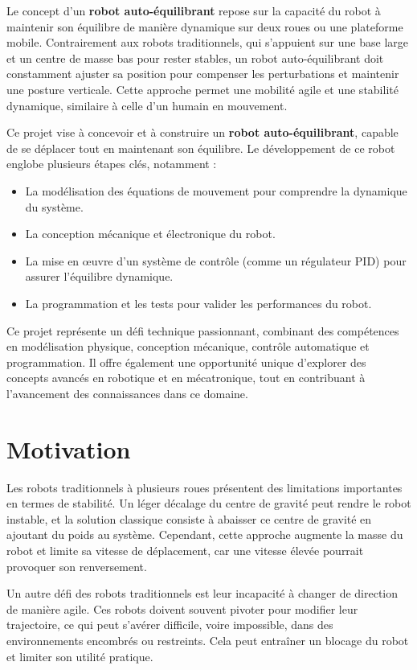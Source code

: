 \documentclass{report}
\begin{document}
Le concept d’un \textbf{robot auto-équilibrant} repose sur la capacité du robot à maintenir son équilibre de manière dynamique sur deux roues ou une plateforme mobile. Contrairement aux robots traditionnels, qui s’appuient sur une base large et un centre de masse bas pour rester stables, un robot auto-équilibrant doit constamment ajuster sa position pour compenser les perturbations et maintenir une posture verticale. Cette approche permet une mobilité agile et une stabilité dynamique, similaire à celle d’un humain en mouvement.

Ce projet vise à concevoir et à construire un \textbf{robot auto-équilibrant}, capable de se déplacer tout en maintenant son équilibre. Le développement de ce robot englobe plusieurs étapes clés, notamment :
\begin{itemize}
    \item La modélisation des équations de mouvement pour comprendre la dynamique du système.
    \item La conception mécanique et électronique du robot.
    \item La mise en œuvre d’un système de contrôle (comme un régulateur PID) pour assurer l’équilibre dynamique.
    \item La programmation et les tests pour valider les performances du robot.
\end{itemize}

Ce projet représente un défi technique passionnant, combinant des compétences en modélisation physique, conception mécanique, contrôle automatique et programmation. Il offre également une opportunité unique d’explorer des concepts avancés en robotique et en mécatronique, tout en contribuant à l’avancement des connaissances dans ce domaine.

\section*{Motivation}

Les robots traditionnels à plusieurs roues présentent des limitations importantes en termes de stabilité. Un léger décalage du centre de gravité peut rendre le robot instable, et la solution classique consiste à abaisser ce centre de gravité en ajoutant du poids au système. Cependant, cette approche augmente la masse du robot et limite sa vitesse de déplacement, car une vitesse élevée pourrait provoquer son renversement.

Un autre défi des robots traditionnels est leur incapacité à changer de direction de manière agile. Ces robots doivent souvent pivoter pour modifier leur trajectoire, ce qui peut s’avérer difficile, voire impossible, dans des environnements encombrés ou restreints. Cela peut entraîner un blocage du robot et limiter son utilité pratique.
\end{document}
